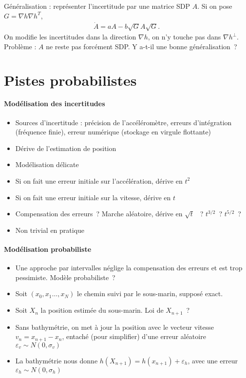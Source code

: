 \documentclass[11pt,oneside]{article}
\begin{document}
Généralisation : représenter l'incertitude par une matrice SDP $A$. Si
on pose $G = \nabla h \nabla h^{T}$,
\begin{align*}
  \dot A = a A - b \sqrt G A \sqrt G.
\end{align*}
On modifie les incertitudes dans la direction $\nabla h$, on n'y
touche pas dans $\nabla h^{\perp}$. Problème : $A$ ne reste
pas forcément SDP. Y a-t-il une bonne généralisation~?

\section{Pistes probabilistes}
  \paragraph{Modélisation des incertitudes}
\begin{itemize}
\item Sources d'incertitude : précision de l'accéléromètre, erreurs
  d'intégration (fréquence finie), erreur numérique (stockage en
  virgule flottante)
\item Dérive de l'estimation de position
\item Modélisation délicate
\item Si on fait une erreur initiale sur l'accélération, dérive en
  $t^{2}$
\item Si on fait une erreur initiale sur la vitesse, dérive en
  $t$
\item Compensation des erreurs~? Marche aléatoire, dérive en $\sqrt t$
 ~? $t^{3/2}$~? $t^{5/2}$~?
\item Non trivial en pratique
\end{itemize}
\paragraph{Modélisation probabiliste}
  \begin{itemize}
  \item Une approche par intervalles néglige la compensation des erreurs
    et est trop pessimiste. Modèle probabiliste~?
  \item Soit $(x_{0}, x_{1} \dots, x_{N})$ le chemin suivi par le
    sous-marin, supposé exact.
  \item Soit $X_{n}$ la position estimée du sous-marin. Loi de
    $X_{n+1}$~?
  \item Sans bathymétrie, on met à jour la position avec le vecteur
    vitesse $v_{n} = x_{n+1} - x_{n}$, entaché (pour simplifier) d'une erreur aléatoire
    $\varepsilon_{v} \sim N(0, \sigma_{v})$
  \item La bathymétrie nous donne $h(X_{n+1}) = h(x_{n+1}) +
    \varepsilon_{h}$, avec une erreur $\varepsilon_{h} \sim N(0, \sigma_{h})$
  \end{itemize}
\end{document}

